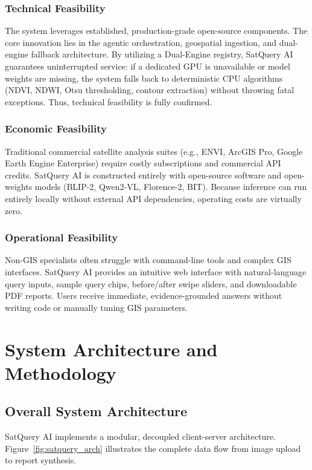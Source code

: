 \documentclass[12pt,a4paper]{report}
\begin{document}
\subsection{Technical Feasibility}
The system leverages established, production-grade open-source components. The core innovation lies in the agentic orchestration, geospatial ingestion, and dual-engine fallback architecture. 
By utilizing a Dual-Engine registry, SatQuery AI guarantees uninterrupted service: if a dedicated GPU is unavailable or model weights are missing, the system falls back to deterministic CPU algorithms (NDVI, NDWI, Otsu thresholding, contour extraction) without throwing fatal exceptions. Thus, technical feasibility is fully confirmed.

\subsection{Economic Feasibility}
Traditional commercial satellite analysis suites (e.g., ENVI, ArcGIS Pro, Google Earth Engine Enterprise) require costly subscriptions and commercial API credits. SatQuery AI is constructed entirely with open-source software and open-weights models (BLIP-2, Qwen2-VL, Florence-2, BIT). Because inference can run entirely locally without external API dependencies, operating costs are virtually zero.

\subsection{Operational Feasibility}
Non-GIS specialists often struggle with command-line tools and complex GIS interfaces. SatQuery AI provides an intuitive web interface with natural-language query inputs, sample query chips, before/after swipe sliders, and downloadable PDF reports. Users receive immediate, evidence-grounded answers without writing code or manually tuning GIS parameters.

\chapter{System Architecture and Methodology}

\section{Overall System Architecture}
SatQuery AI implements a modular, decoupled client-server architecture. Figure~\ref{fig:satquery_arch} illustrates the complete data flow from image upload to report synthesis.
\end{document}
